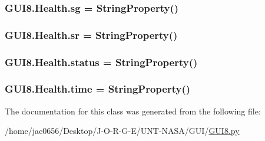 \subsubsection[{\texorpdfstring{sg}{sg}}]{\setlength{\rightskip}{0pt plus 5cm}G\+U\+I8.\+Health.\+sg = String\+Property()\hspace{0.3cm}{\ttfamily [static]}}\hypertarget{classGUI8_1_1Health_a8d847a1f3db5ef07ae447de48eb27a7a}{}\label{classGUI8_1_1Health_a8d847a1f3db5ef07ae447de48eb27a7a}
\subsubsection[{\texorpdfstring{sr}{sr}}]{\setlength{\rightskip}{0pt plus 5cm}G\+U\+I8.\+Health.\+sr = String\+Property()\hspace{0.3cm}{\ttfamily [static]}}\hypertarget{classGUI8_1_1Health_a1c95aff816745a8727529768e6de6fdf}{}\label{classGUI8_1_1Health_a1c95aff816745a8727529768e6de6fdf}
\subsubsection[{\texorpdfstring{status}{status}}]{\setlength{\rightskip}{0pt plus 5cm}G\+U\+I8.\+Health.\+status = String\+Property()\hspace{0.3cm}{\ttfamily [static]}}\hypertarget{classGUI8_1_1Health_a51e3464840e9630763299d492a988b12}{}\label{classGUI8_1_1Health_a51e3464840e9630763299d492a988b12}
\subsubsection[{\texorpdfstring{time}{time}}]{\setlength{\rightskip}{0pt plus 5cm}G\+U\+I8.\+Health.\+time = String\+Property()\hspace{0.3cm}{\ttfamily [static]}}\hypertarget{classGUI8_1_1Health_a70f5dedaa1d04590be02c340943fa8e4}{}\label{classGUI8_1_1Health_a70f5dedaa1d04590be02c340943fa8e4}


The documentation for this class was generated from the following file\+:\begin{DoxyCompactItemize}
\item 
/home/jac0656/\+Desktop/\+J-\/\+O-\/\+R-\/\+G-\/\+E/\+U\+N\+T-\/\+N\+A\+S\+A/\+G\+U\+I/\hyperlink{GUI8_8py}{G\+U\+I8.\+py}\end{DoxyCompactItemize}
